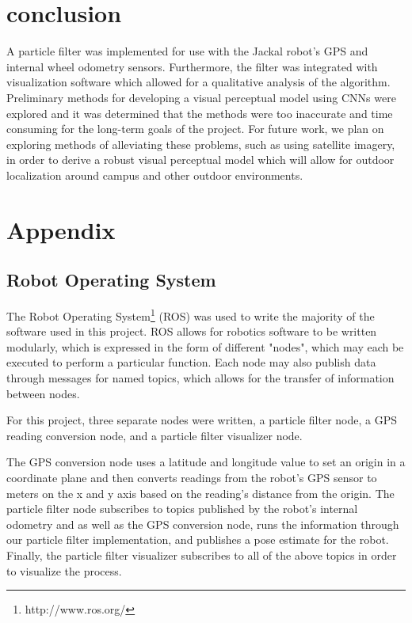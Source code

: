 \documentclass[letterpaper, 12 pt, conference]{ieeeconf}  %
\begin{document}
\section{conclusion}

A particle filter was implemented for use with the Jackal robot's GPS and internal wheel odometry sensors. Furthermore, the filter was integrated with visualization software which allowed for a qualitative analysis of the algorithm. Preliminary methods for developing a visual perceptual model using CNNs were explored and it was determined that the methods were too inaccurate and time consuming for the long-term goals of the project. For future work, we plan on exploring methods of alleviating these problems, such as using satellite imagery, in order to derive a robust visual perceptual model which will allow for outdoor localization around campus and other outdoor environments. 

\newpage




\newpage

\section*{Appendix}

\subsection{Robot Operating System}

The Robot Operating System\footnote{http://www.ros.org/} (ROS) was used to write the majority of the software used in this project. ROS allows for robotics software to be written modularly, which is expressed in the form of different "nodes", which may each be executed to perform a particular function. Each node may also publish data through messages for named topics, which allows for the transfer of information between nodes. 
\par
For this project, three separate nodes were written, a particle filter node, a GPS reading conversion node, and a particle filter visualizer node. 
\par
The GPS conversion node uses a latitude and longitude value to set an origin in a coordinate plane and then converts readings from the robot's GPS sensor to meters on the x and y axis based on the reading's distance from the origin. The particle filter node subscribes to topics published by the robot's internal odometry and as well as the GPS conversion node, runs the information through our particle filter implementation, and publishes a pose estimate for the robot. Finally, the particle filter visualizer subscribes to all of the above topics in order to visualize the process. 
\end{document}
